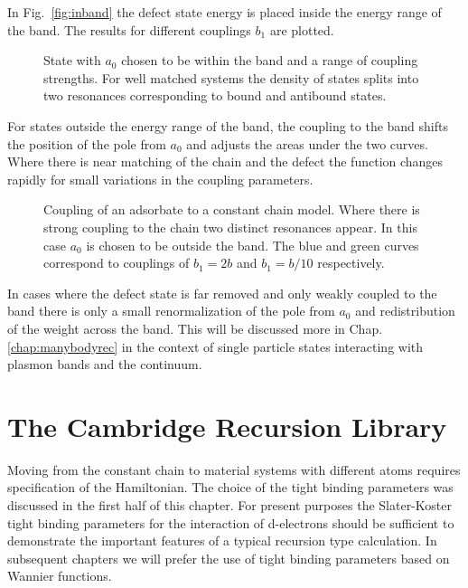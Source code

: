 In Fig.~\ref{fig:inband} the defect state energy is placed inside the energy range of the band. The
results for different couplings $b_{1}$ are plotted.
%
\begin{figure}
\begin{center}
{\graphicspath{{./invariance/chain_figs/}}}
\caption{State with $a_{0}$ chosen to be within the band and a range of coupling strengths. 
For well matched systems the density of states splits into two resonances corresponding 
to bound and antibound states.}
\end{center}
\end{figure}
%

For states outside the energy range of the band, the coupling to the band shifts the position
of the pole from $a_{0}$ and adjusts the areas under the two curves. Where there is 
near matching of the chain and the defect the function changes rapidly for small
variations in the coupling parameters.
%
\begin{figure}
\begin{center}
{\graphicspath{{./invariance/chain_figs/}}}
\caption{Coupling of an adsorbate to a constant chain model. Where there is strong coupling
to the chain two distinct resonances appear. In this case $a_{0}$ is chosen to be outside the band.
The blue and green curves correspond to couplings of $b_{1}=2b$ and $b_{1}=b/10$ respectively.
\label{fig:gfconstchain}}
\end{center}
\end{figure}
%
In cases where the defect state is far removed and only weakly coupled to the band
there is only a small renormalization of the pole from $a_{0}$ and redistribution of the weight across the band.
This will be discussed more in Chap.\ref{chap:manybodyrec} in the context of single particle states
interacting with plasmon bands and the continuum.

\section{The Cambridge Recursion Library}
Moving from the constant chain to material systems with different atoms requires specification
of the Hamiltonian. The choice of the tight binding parameters was discussed in the first half of this
chapter. For present purposes the Slater-Koster tight binding parameters for the interaction of 
d-electrons should be sufficient to demonstrate the important features of a typical recursion type calculation.
In subsequent chapters we will prefer the use of tight binding parameters based on Wannier functions.

